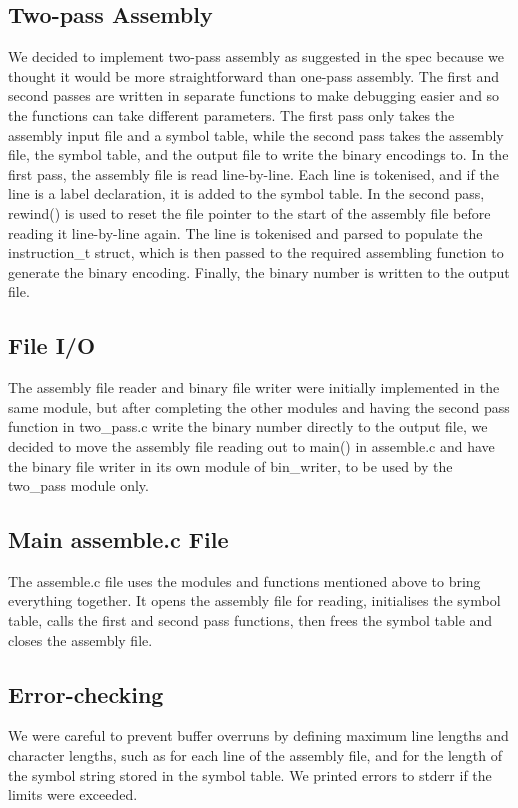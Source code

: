 \documentclass[11pt]{article}
\begin{document}
\subsection{Two-pass Assembly}
We decided to implement two-pass assembly as suggested in the spec because we thought it would be more straightforward than one-pass assembly. The first and second passes are written in separate functions to make debugging easier and so the functions can take different parameters. The first pass only takes the assembly input file and a symbol table, while the second pass takes the assembly file, the symbol table, and the output file to write the binary encodings to.
In the first pass, the assembly file is read line-by-line. Each line is tokenised, and if the line is a label declaration, it is added to the symbol table.  
In the second pass, rewind() is used to reset the file pointer  to the start of the assembly file before reading it line-by-line again. The line is tokenised and parsed to populate the instruction\_t struct, which is then passed to the required assembling function to generate the binary encoding. Finally, the binary number is written to the output file.

\subsection{File I/O}
The assembly file reader and binary file writer were initially implemented in the same module, but after completing the other modules and having the second pass function in two\_pass.c write the binary number directly to the output file, we decided to move the assembly file reading out to main() in assemble.c and have the binary file writer in its own module of bin\_writer, to be used by the two\_pass module only.

\subsection{Main assemble.c File}
The assemble.c file uses the modules and functions mentioned above to bring everything together. It opens the assembly file for reading, initialises the symbol table, calls the first and second pass functions, then frees the symbol table and closes the assembly file.

\subsection{Error-checking}
We were careful to prevent buffer overruns by defining maximum line lengths and character lengths, such as for each line of the assembly file, and for the length of the symbol string stored in the symbol table. We printed errors to stderr if the limits were exceeded.
\end{document}
